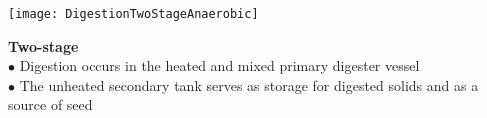 \begin{minipage}{.5\textwidth}
      \texttt{[image: DigestionTwoStageAnaerobic]}
    \end{minipage}
\begin{minipage}{.35\textwidth}
        \end{minipage}
\begin{minipage}{.35\textwidth}\textbf{Two-stage}\\
$\bullet$ Digestion occurs in the heated and mixed primary digester vessel\\
$\bullet$ The unheated secondary tank serves as storage for digested solids and as a source of seed\\  \end{minipage}\\
\vspace{1cm}

\vspace{1cm}

